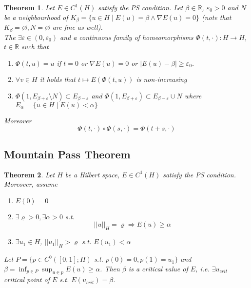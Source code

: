 \documentclass[a4paper, 12pt]{article}
\theoremstyle{plain}
\newtheorem{theorem}{Theorem}[section] %
\theoremstyle{definition}
\theoremstyle{lemma}
\theoremstyle{remark}
\theoremstyle{corollary}
\theoremstyle{example}
\begin{document}
	\begin{theorem}
		Let $E \in C^1(H)$ satisfy the PS condition. Let $\beta \in \mathbb{R}$, $\varepsilon_0 > 0$ and $N$ be a neighbourhood of $K_\beta = \{u \in H \mid E(u) = \beta \land \nabla E(u) = 0\}$ (note that $K_\beta = \varnothing, N = \varnothing$ are fine as well).\\
		The $\exists \varepsilon \in (0,\varepsilon_0)$ and a continuous family of homeomorphisms $\Phi(t,\cdot): H \to H$, $t \in \mathbb{R}$ such that \begin{enumerate}
			\item $\Phi(t,u) = u$ if $t=0$ or $\nabla E(u) = 0$ or $\left|E(u) - \beta\right| \geq \varepsilon_0$.
			\item $\forall v \in H$ it holds that $t \mapsto E(\Phi(t,u))$ is non-increasing
			\item $\Phi(1,E_{\beta+\varepsilon}\setminus N) \subset E_{\beta - \varepsilon}$ and $\Phi(1,E_{\beta + \varepsilon}) \subset E_{\beta - \varepsilon} \cup N$ where $E_\alpha = \{u \in H \mid E(u) < \alpha\}$
		\end{enumerate}
		Moreover \[\Phi(t,\cdot) \circ \Phi(s,\cdot) = \Phi(t+s, \cdot)\]
	\end{theorem}
	\subsection{Mountain Pass Theorem}
	\begin{theorem}
		Let $H$ be a Hilbert space, $E \in C^1(H)$ satisfy the PS condition. Moreover, assume \begin{enumerate}
			\item $E(0)=0$
			\item $\exists \varrho>0, \exists \alpha > 0$ s.t. \[||u||_H = \varrho \Rightarrow E(u) \geq \alpha\]
			\item $\exists u_1 \in H$, $||u_1||_H > \varrho$ s.t. $E(u_1) < \alpha$
		\end{enumerate}
		Let $P = \{p \in C^0([0,1];H)$ s.t. $p(0) = 0, p(1) = u_1\}$ and $\beta = \inf_{p \in P}\sup_{u \in p} E(u) \geq \alpha$. Then $\beta$ is a critical value of $E$, i.e. $\exists u_{crit}$ critical point of $E$ s.t. $E(u_{crit}) = \beta$.
	\end{theorem}
\end{document}
